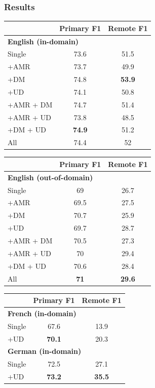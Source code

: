 \documentclass[t,handout,xcolor={svgnames}]{beamer}
\begin{document}
\begin{frame}
\frametitle{Results}
\centering
\small
\setlength\tabcolsep{3pt}
\begin{tabular}{lcc}
& \footnotesize \bf Primary F1 & \footnotesize \bf Remote F1 \\
\hline
\multicolumn{3}{l}{\small \bf English (in-domain)} \\
\footnotesize Single
& 73.6 & 51.5 \\
\cline{1-1}
\footnotesize +AMR
& 73.7 & 49.9 \\
\footnotesize +DM
& 74.8 & \textbf{53.9} \\
\footnotesize +UD
& 74.1 & 50.8 \\
\footnotesize +AMR + DM
& 74.7 & 51.4 \\
\footnotesize +AMR + UD
& 73.8 & 48.5 \\
\footnotesize +DM + UD
& \textbf{74.9} & 51.2 \\
\footnotesize All
& 74.4 & 52
\end{tabular}
\hfill
\begin{tabular}{lcc}
& \footnotesize \bf Primary F1 & \footnotesize \bf Remote F1 \\
\hline
\multicolumn{3}{l}{\small \bf English (out-of-domain)} \\
\footnotesize Single
& 69 & 26.7 \\
\cline{1-1}
\footnotesize +AMR
& 69.5 & 27.5 \\
\footnotesize +DM
& 70.7 & 25.9 \\
\footnotesize +UD
& 69.7 & 28.7 \\
\footnotesize +AMR + DM
& 70.5 & 27.3 \\
\footnotesize +AMR + UD
& 70 & 29.4 \\
\footnotesize +DM + UD
& 70.6 & 28.4 \\
\footnotesize All
& \textbf{71} & \textbf{29.6}
\end{tabular}
\vfill
\begin{tabular}{lcc}
& \footnotesize \bf Primary F1 & \footnotesize \bf Remote F1 \\
\hline
\multicolumn{3}{l}{\small \bf French (in-domain)} \\
\small Single & 67.6 & 13.9 \\
\small +UD & \textbf{70.1} & 20.3 \\
\hline
\multicolumn{3}{l}{\small \bf German (in-domain)} \\
\small Single & 72.5 & 27.1 \\
\small +UD & \textbf{73.2} & \textbf{35.5}
\end{tabular}
\end{frame}
\end{document}
